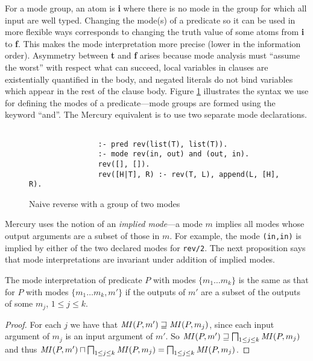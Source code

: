 \documentclass{tlp}
\newcommand{\ident}[1]{\mbox{\textit{#1}}}
\begin{document}
For a mode group, an atom is \textbf{i} where there is no mode in
the group for which all input are well typed.  Changing the mode(s) of a
predicate so it can be used in more flexible ways corresponds to changing
the truth value of some atoms from \textbf{i} to \textbf{f}.  This makes
the mode interpretation more precise (lower in the information order).
Asymmetry between \textbf{t} and \textbf{f} arises because mode
analysis must ``assume the worst'' with respect what can succeed, local
variables in clauses are existentially quantified in the body, and
negated literals do not bind variables which appear in the rest of the
clause body. 
Figure \ref{fig-nrev} illustrates the syntax we use for defining the
modes of a predicate---mode groups are formed using the keyword ``and''.
The Mercury equivalent is to use two separate mode declarations.

\begin{figure}
\begin{verbatim}

                :- pred rev(list(T), list(T)).
                :- mode rev(in, out) and (out, in).
                rev([], []).
                rev([H|T], R) :- rev(T, L), append(L, [H], R).
\end{verbatim}
\caption{Naive reverse with a group of two modes\label{fig-nrev}}
\end{figure}

Mercury uses the notion of an \emph{implied mode}---a mode $m$
implies all modes whose output arguments are a subset of those in $m$.
For example, the mode \texttt{(in,in)} is implied by either of the two
declared modes for \texttt{rev/2}.  
The next proposition says that mode 
interpretations are invariant under addition of implied modes.

\begin{proposition}
\label{prop-imp-mode}
The mode interpretation of predicate $P$ with modes $\{m_1 \ldots m_k\}$
is the same as that for $P$ with modes $\{m_1 \ldots m_k, m'\}$ if
the outputs of $m'$ are a subset of the outputs of some $m_j$, $1 \leq j
\leq k$.
\end{proposition}
\begin{proof}
For each $j$ we have that $\ident{MI}(P, m') \sqsupseteq \ident{MI}(P, m_j)$, 
since each input argument of $m_j$ is an input argument of $m'$.
So $\ident{MI}(P, m') \sqsupseteq \bigsqcap_{1 \leq j \leq k} \ident{MI}(P, m_j)$
and thus
$\ident{MI}(P, m') \sqcap \bigsqcap_{1 \leq j \leq k} \ident{MI}(P, m_j) =
\bigsqcap_{1 \leq j \leq k} \ident{MI}(P, m_j)$.
\end{proof}
\end{document}
